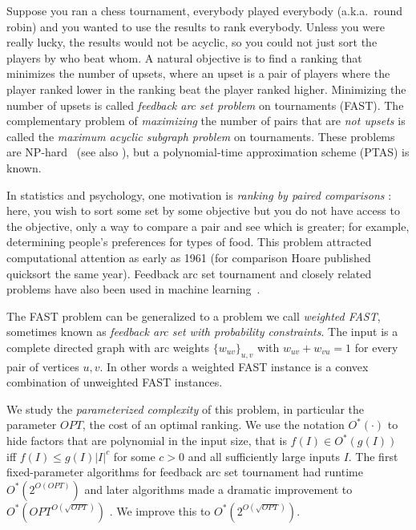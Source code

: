 \documentclass[envcountsame,oribibl]{llncs}
\newcommand{\set}[1]{\{#1\}}                        \newcommand{\setof}[2]{\{\,{#1}\::\:{#2}\,\}}        \newcommand{\groupFrac}[2]{\left(\frac{#1}{#2}\right)}
\newcommand{\fast}{\textsc{FAST}}
\begin{document}
Suppose you ran a chess tournament, everybody played everybody (a.k.a.\ round robin) and you wanted to use the results to rank everybody.  Unless you were really lucky, the results would not be acyclic, so you could not just sort the players by who beat whom. A natural objective is to find a ranking that minimizes the number of upsets, where an upset is a pair of players where the player ranked lower in the ranking beat the player ranked higher. Minimizing the number of upsets is called \emph{feedback arc set problem} on tournaments (\fast). The complementary problem of \emph{maximizing} the number of pairs that are \emph{not upsets} is called the \emph{maximum acyclic subgraph problem} on tournaments. These problems are NP-hard~\citep{Ailon08aggregating,Alon06,Charbit07} (see also \citep{Conitzer06a}), but a polynomial-time approximation scheme (PTAS) \cite{Mathieu09fast} is known.

In statistics and psychology, one motivation is \emph{ranking by paired comparisons} \citep{Slater61}: here, you wish to sort some set by some objective but you do not have access to the objective, only a way to compare a pair and see which is greater; for example, determining people's preferences for types of food. This problem attracted computational attention as early as 1961 \citep{Slater61} (for comparison Hoare published quicksort the same year). Feedback arc set tournament and closely related problems have also been used in machine learning~\citep{Cohen99,Ailon08aggregating}.

The \fast{} problem can be generalized to a problem we call \emph{weighted \fast{}}, sometimes known as \emph{feedback arc set with probability constraints}.
The input is a complete directed graph with arc weights $\set{w_{uv}}_{u,v}$ with $w_{uv} + w_{vu} = 1$ for every pair of vertices $u,v$. In other words a weighted \fast{} instance is a convex combination of unweighted \fast{} instances.

We study the \emph{parameterized complexity} of this problem, in particular the parameter $OPT$, the cost of an optimal ranking.  We use the notation $O^*(\cdot)$ to hide factors that are polynomial in the input size, that is $f(I) \in O^*(g(I))$ iff $f(I) \le g(I) |I|^c$ for some $c>0$ and all sufficiently large inputs $I$. The first fixed-parameter algorithms for feedback arc set tournament had runtime $O^*(2^{O(OPT)})$ and later algorithms made a dramatic improvement to $O^*(OPT^{O(\sqrt{OPT})})$ \cite{Alon09}. We improve this to $O^*(2^{O(\sqrt{OPT})})$.
\end{document}
